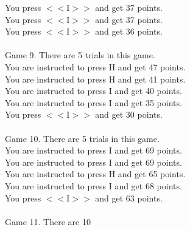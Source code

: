 \documentclass[pdflatex,sn-nature]{sn-jnl}%
\theoremstyle{thmstyleone}%
\theoremstyle{thmstyletwo}%
\theoremstyle{thmstylethree}%
\begin{document}
You press $<<$I$>>$ and get 37 points. $~$\\ 
You press $<<$I$>>$ and get 37 points. $~$\\ 
You press $<<$I$>>$ and get 36 points. $~$\\ 
 $~$\\ 
Game 9. There are 5 trials in this game. $~$\\ 
You are instructed to press H and get 47 points. $~$\\ 
You are instructed to press H and get 41 points. $~$\\ 
You are instructed to press I and get 40 points. $~$\\ 
You are instructed to press I and get 35 points. $~$\\ 
You press $<<$I$>>$ and get 30 points. $~$\\ 
 $~$\\ 
Game 10. There are 5 trials in this game. $~$\\ 
You are instructed to press I and get 69 points. $~$\\ 
You are instructed to press I and get 69 points. $~$\\ 
You are instructed to press H and get 65 points. $~$\\ 
You are instructed to press I and get 68 points. $~$\\ 
You press $<<$I$>>$ and get 63 points. $~$\\ 
 $~$\\ 
Game 11. There are 10  
\end{document}
